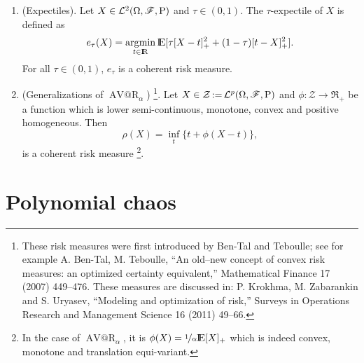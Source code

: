 \documentclass[a4paper,10pt]{article}
\begin{document}
\begin{enumerate}
 \item (Expectiles). Let $X\in\mathcal{L}^2(\Omega,\mathscr{F},\mathrm{P})$ and $\tau\in(0,1)$. The $\tau$-expectile of 
       $X$ is defined as 
       \[
        e_{\tau}(X) = \argmin_{t\in\Re} \E[\tau [X-t]_+^2 + (1-\tau)[t-X]_+^2].
       \]
      For all $\tau\in(0,1)$, $e_{\tau}$ is a coherent risk measure.
 \item (Generalizations of $\operatorname{AV@R}_\alpha$)%
	     \footnote{%
	       These risk measures were first introduced by Ben-Tal and Teboulle; see for example
               A. Ben-Tal, M. Teboulle, ``An old–new concept of convex risk measures: an
	       optimized certainty equivalent,'' Mathematical Finance 17 (2007) 449--476.
	       These measures are discussed in: P. Krokhma, M. Zabarankin and S. Uryasev,
	       ``Modeling and optimization of risk,'' 
	       Surveys in Operations Research and Management Science 16 (2011) 49--66.%
	      }. 
	Let $X\in\mathcal{Z}{}\mathop{\mathrel{:}=}{} \mathcal{L}^p(\Omega,\mathscr{F},\mathrm{P})$ and $\phi:\mathcal{Z}\to\Re_+$ be a function
	which is lower semi-continuous, monotone, convex and positive homogeneous. Then
	\[
	 \rho(X) = \inf_t \{t + \phi(X-t)\},
	\]
        is a coherent risk measure%
	      \footnote{In the case of $\operatorname{AV@R}_\alpha$, it is $\phi(X) = \nicefrac{1}{\alpha}\E[X]_+$
	      which is indeed convex, monotone and translation equi-variant.}.
\end{enumerate}


\section{Polynomial chaos}
\end{document}

